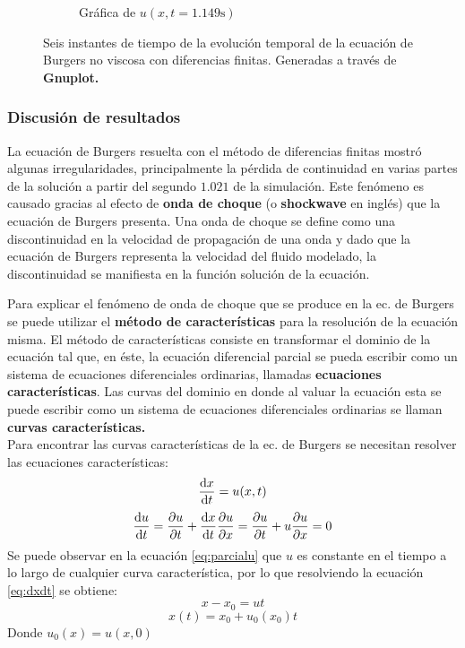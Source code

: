 \documentclass[12pt]{article}
\begin{document}
\begin{figure}[ht]
\begin{subfigure}{0.4\textwidth}
			\caption*{Gráfica de $u(x,t=1.149\unit{\second})$}
			\label{fig:b1ddf6}
		\end{subfigure}
		\caption{Seis instantes de tiempo de la evolución temporal de la ecuación de Burgers no viscosa con diferencias finitas. Generadas a través de \textbf{Gnuplot.}}
		\label{fig:instantesB1DDF}
	\end{figure}
	
	
	\subsubsection{Discusión de resultados}
	\label{sec:discusion}
	La ecuación de Burgers resuelta con el método de diferencias finitas mostró algunas irregularidades, principalmente la pérdida de continuidad en varias partes de la solución a partir del segundo $1.021$ de la simulación. Este fenómeno es causado gracias al efecto de \textbf{onda de choque}  (o \textbf{shockwave} en inglés) que la ecuación de Burgers presenta. Una onda de choque se define como una discontinuidad en la velocidad de propagación de una onda y dado que la ecuación de Burgers representa la velocidad del fluido modelado, la discontinuidad se manifiesta en la función solución de la ecuación.
	
	Para explicar el fenómeno de onda de choque que se produce en la ec. de Burgers se puede utilizar el \textbf{método de características} para la resolución de la ecuación misma. El método de características consiste en transformar el dominio de la ecuación tal que, en éste, la ecuación diferencial parcial se pueda escribir como un sistema de ecuaciones diferenciales ordinarias, llamadas \textbf{ecuaciones características}. Las curvas del dominio en donde al valuar la ecuación esta se puede escribir como un sistema de ecuaciones diferenciales ordinarias se llaman \textbf{curvas características.}\\
	Para encontrar las curvas características de la ec. de Burgers se necesitan resolver las ecuaciones características: 
	\begin{equation}
		\dv{x}{t} = u(x,t)
		\label{eq:dxdt}
	\end{equation}
	\begin{equation}
		\dv{u}{t} = \pdv{u}{t} + \dv{x}{t}\pdv{u}{x} = \pdv{u}{t}+u\pdv{u}{x} = 0
		\label{eq:parcialu}
	\end{equation}
	Se puede observar en la ecuación \ref{eq:parcialu} que $u$ es constante en el tiempo a lo largo de cualquier curva característica, por lo que resolviendo la ecuación \ref{eq:dxdt} se obtiene:
	\begin{equation}
		x-x_{0} = ut
	\end{equation}
	\begin{equation}
		x(t) = x_{0} + u_{0}(x_0)t
		\label{eq:caracteristica}
	\end{equation}
	Donde $u_0(x) = u(x,0)$
	
\end{document}
